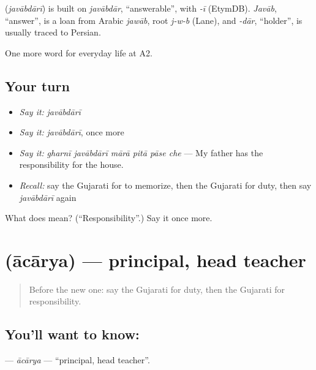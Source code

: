 \begin{cousinweb}
\textbf{} (\emph{javābdārī}) is built on \emph{javābdār}, \textquotedblleft{}answerable\textquotedblright{}, with \emph{-ī} (EtymDB). \emph{Javāb}, \textquotedblleft{}answer\textquotedblright{}, is a loan from Arabic \emph{jawāb}, root \emph{j-w-b} (Lane), and \emph{-dār}, \textquotedblleft{}holder\textquotedblright{}, is usually traced to Persian.
\end{cousinweb}

\begin{grammarlens}[title={What you've built}]
One more word for everyday life at A2.
\end{grammarlens}

\subsection*{Your turn}
\begin{itemize}
\raggedright
  \item \emph{Say it:} \emph{javābdārī}
  \item \emph{Say it:} \emph{javābdārī}, once more
  \item \emph{Say it:} \emph{gharnī javābdārī mārā pitā pāse che} — My father has the responsibility for the house.
  \item \emph{Recall:} say the Gujarati for to memorize, then the Gujarati for duty, then say \emph{javābdārī} again
\end{itemize}

\begin{tcolorbox}[breakable,colback=teal!4,colframe=teal!35!black,title={Before you move on}]
What does  mean? (\textquotedblleft{}Responsibility\textquotedblright{}.) Say it once more.
\end{tcolorbox}
\section[\texorpdfstring{\gu{આચાર્ય} (ācārya)}{આચાર્ય (ācārya)}]{ (ācārya) — principal, head teacher}

\label{lesson:GU-C252-acarya}



\begin{quote}
Before the new one: say the Gujarati for duty, then the Gujarati for responsibility.
\end{quote}

\subsection*{You'll want to know: }
\textbf{} — \emph{ācārya} — \textquotedblleft{}principal, head teacher\textquotedblright{}.

